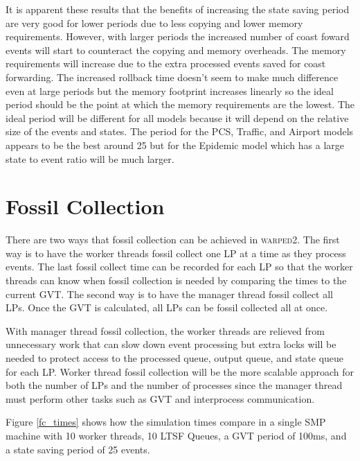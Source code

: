 \documentclass[11pt]{book}
\begin{document}
It is apparent these results that the benefits of increasing the state saving period are very good
for lower periods due to less copying and lower memory requirements. However, with larger periods
the increased number of coast foward events will start to counteract the copying and memory
overheads. The memory requirements will increase due to the extra processed events saved for
coast forwarding. The increased rollback time doesn't seem to make much difference even at large
periods but the memory footprint increases linearly so the ideal period should be the point at
which the memory requirements are the lowest. The ideal period will be different for all models
because it will depend on the relative size of the events and states. The period for the PCS,
Traffic, and Airport models appears to be the best around 25 but for the Epidemic model which
has a large state to event ratio will be much larger.

\section{Fossil Collection}

There are two ways that fossil collection can be achieved in \textsc{warped2}. The first way
is to have the worker threads fossil collect one LP at a time as they process events. The last
fossil collect time can be recorded for each LP so that the worker threads can know when fossil
collection is needed by comparing the times to the current GVT. The second way is to have the
manager thread fossil collect all LPs. Once the GVT is calculated, all LPs can be fossil collected
all at once.

With manager thread fossil collection, the worker threads are relieved from unnecessary work
that can slow down event processing but extra locks will be needed to protect access to the
processed queue, output queue, and state queue for each LP. Worker thread fossil collection
will be the more scalable approach for both the number of LPs and the number of processes since
the manager thread must perform other tasks such as GVT and interprocess communication.

Figure \ref{fc_times} shows how the simulation times compare in a single SMP machine with
10 worker threads, 10 LTSF Queues, a GVT period of 100ms, and a state saving period of 25 events.
\end{document}
